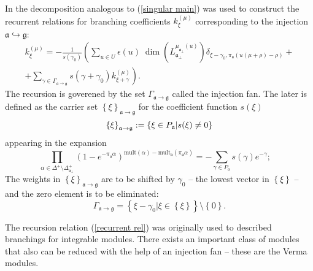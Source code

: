 \documentclass[12pt]{article}
\theoremstyle{definition}
\newcommand{\gf}{\mathfrak{g}}
\newcommand{\af}{\mathfrak{a}}
\newcommand{\afb}{\mathfrak{a}_{\bot}}
\begin{document}
In \cite{2010arXiv1007.0318L} the decomposition analogous to (\ref{singular main}) was
used to construct the recurrent relations for branching coefficients $k_{\xi
}^{\left( \mu \right) }$ corresponding to the injection $\af%
\hookrightarrow \gf$:
\begin{equation}
\begin{array}{c}
k_{\xi }^{\left( \mu \right) }=-\frac{1}{s\left( \gamma _{0}\right) }\left(
\sum_{u\in U}\epsilon (u)\;\dim \left( L_{\afb}^{\mu _{\af%
_{\perp }}\left( u\right) }\right) \delta _{\xi -\gamma _{0},\pi _{\af%
}(u(\mu +\rho )-\rho )}+\right.  \\
\left. +\sum_{\gamma \in \Gamma _{\af\rightarrow \gf}}s\left(
\gamma +\gamma _{0}\right) k_{\xi +\gamma }^{\left( \mu \right) }\right) .
\end{array}
\label{recurrent rel}
\end{equation}
The recursion is goverened by the set $\Gamma _{\af\rightarrow \gf}
$ called the injection fan. The later is defined as the carrier set $\left\{
\xi \right\} _{\af\rightarrow \gf}$ for the coefficient function $%
s(\xi )$
\begin{equation*}
\left\{ \xi \right\} _{\af\rightarrow \gf}:=\left\{ \xi \in P_{%
\af}|s(\xi )\neq 0\right\}
\end{equation*}
appearing in the expansion
\begin{equation}
\prod_{\alpha \in \Delta ^{+}\setminus \Delta _{\afb }^{+}}\left( 1-e^{-\pi
_{\af}\alpha }\right) ^{\mathrm{mult}(\alpha )-\mathrm{mult}_{\af%
}(\pi _{\af}\alpha )}=-\sum_{\gamma \in P_{\af}}s(\gamma
)e^{-\gamma };\quad
\end{equation}
The weights in $\left\{ \xi \right\} _{\af\rightarrow \gf}$ are to
be shifted by $\gamma _{0}$ -- the lowest vector in $\left\{ \xi \right\} $
-- and the zero element is to be eliminated:
\begin{equation}
\Gamma _{\af\rightarrow \gf}=\left\{ \xi -\gamma _{0}|\xi \in
\left\{ \xi \right\} \right\} \setminus \left\{ 0\right\} .
\end{equation}

The recursion relation (\ref{recurrent rel}) was originally used to
described branchings for integrable modules. There exists an important class
of modules that also can be reduced with the help of an injection fan --
these are the Verma modules.
\end{document}
